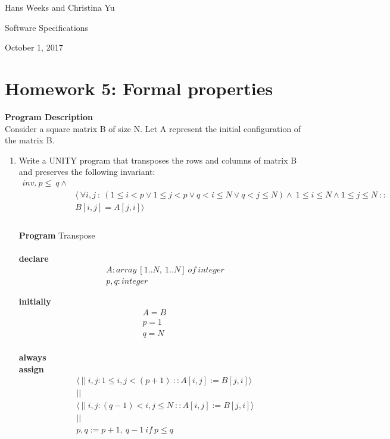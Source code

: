\documentclass{article}
\begin{document}
\hfill Hans Weeks and Christina Yu

\hfill Software Specifications

\hfill October 1, 2017
\section*{Homework 5: Formal properties}
\textbf{Program Description}\\
Consider a square matrix B of size N. Let A represent the initial configuration of the matrix B. \\
\begin{enumerate}
\item
Write a UNITY program that transposes the rows and columns of matrix B and preserves the following invariant:\\
\begin{align*}
 inv. \ p \leq \ q \wedge \\
&\langle \ \forall i,j \ : \ (1\leq i <p \vee 1 \leq j<p \vee q<i \leq N \vee q<j \leq N) \wedge \ 1 \leq i \leq N \wedge 1 \leq j \leq N \ :: \\ 
&B[i,j]=A[j,i]\rangle\\
\end{align*}
\\
\textbf{Program} Transpose\\
\\
\textbf{declare}\\
\begin{align*}
&A: array \ [1..N,\ 1..N]\ of \ integer\\
&p, q: integer
\end{align*}

\textbf{initially}\\
\begin{align*}
A=B\quad&\\
p=1\quad&\\
q=N\quad&\\
\end{align*}


\textbf{always}\\
\textbf{assign}\\
\begin{align*}
&\langle \ || \ i,j : 1\leq i,j< (p+1) \ :: A[i,j]:=B[j,i] \rangle \\
&||\\
&\langle \ || \ i,j : (q-1) < i,j \leq N \ :: A[i,j]:=B[j,i] \rangle \\
&||\\
&p,q := p+1,\ q-1\ if\ p \leq q
\end{align*}


\end{enumerate}
\end{document}
